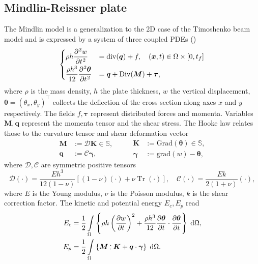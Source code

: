 \documentclass{ifacconf}
\DeclareMathOperator{\Tr}{Tr}
\def\onedot{$\mathsurround0pt\ldotp$}
\def\cddot{%
	\mathbin{\vcenter{\baselineskip.67ex
			\hbox{\onedot}\hbox{\onedot}}%
}}
\begin{document}
\subsection{Mindlin-Reissner plate}
The Mindlin model is a generalization to the 2D case of the Timoshenko beam model and is expressed by a system of three coupled PDEs (\cite{timoshenko1959theory}) 
\begin{equation}
\begin{cases}
\displaystyle \rho h \diffp[2]{w}{t} &= \mathrm{div}(\bm{q}) + f, \quad (\bm{x}, t) \in \Omega \times [0, t_f]  \vspace{1mm}\\
\displaystyle \frac{\rho h^3}{12} \diffp[2]{\bm \theta}{t} &= \bm{q} + \mathrm{Div}(\bm M) + \bm{\tau}, \\
\end{cases}
\end{equation}
where $\rho$ is the mass density, $h$ the plate thickness, $w$ the vertical displacement, $\bm \theta = (\theta_x, \theta_y)^\top$ collects the deflection of the cross section along axes $x$ and $y$ respectively. The fields $f, \bm{\tau}$ represent distributed forces and momenta. Variables $\bm{M}, \bm{q}$ represent the momenta tensor and the shear stress. The Hooke law relates those to the curvature tensor and shear deformation vector
\begin{equation*}
\begin{aligned}
\bm{M} &:= \mathcal{D} \bm{K} \in \mathbb{S}, \\ \bm{q} &:= \mathcal{C} \bm{\gamma},
\end{aligned} \qquad
\begin{aligned}
\bm{K} &:= \mathrm{Grad}(\bm{\theta}) \in \mathbb{S}, \\ \bm{\gamma} &:= \mathrm{grad}(w) - \bm{\theta}, 
\end{aligned}
\end{equation*}
where $\mathcal{D}, \mathcal{C}$ are symmetric positive tensors
\begin{equation}
\label{eq:bend_rig_tensor}
	\mathcal{D} (\cdot) = \frac{E h^3}{12 (1 - \nu)}[(1-\nu)(\cdot) + \nu \Tr(\cdot)], \quad \mathcal{C} (\cdot) = \frac{E k }{2(1+\nu)}(\cdot),
\end{equation}
where $E$ is the Young modulus, $\nu$ is the Poisson modulus, $k$ is the shear correction factor.
 The kinetic and potential energy  $E_c, E_p$ read
\begin{equation}
\begin{aligned}
E_c &=  \frac{1}{2} \int_{\Omega} \left\{ \rho h \left(\diffp{w}{t} \right)^2 +  \frac{\rho h^3}{12} \diffp{\bm{\theta}}{t} \cdot \diffp{\bm{\theta}}{t}  \right\} \d\Omega, \\
E_p &= \frac{1}{2} \int_{\Omega} \left\{ \bm{M} \cddot \bm{K} + \bm{q} \cdot \bm{\gamma}  \right\}\d\Omega.
\end{aligned}
\end{equation} 
\end{document}
